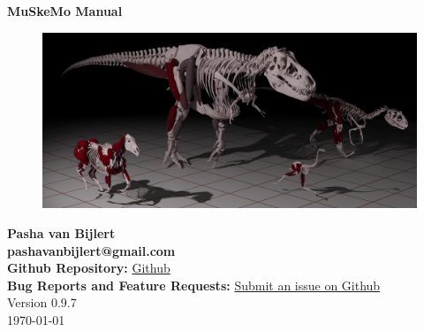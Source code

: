 \documentclass{article}
\begin{document}












\begin{center}
    {\huge \textbf{MuSkeMo Manual}}\\[20pt]  %
    \vspace{10pt}  %

    \begin{figure}[h]
        \centering
        \includegraphics[width=\textwidth]{figures/cover_pic.png} %
    \end{figure}
    \setcounter{figure}{0}
    \vspace{20pt} %
    
    {\Large \textbf{Pasha van Bijlert}}\\
    \vspace{10pt}
    \textbf{pashavanbijlert@gmail.com}\\
    \textbf{Github Repository:} \href{https://github.com/PashavanBijlert/MuSkeMo}{Github} \\
    \textbf{Bug Reports and Feature Requests:} \href{https://github.com/PashavanBijlert/MuSkeMo/issues}{Submit an issue on Github} \\
    \vspace{20pt}
    {\large Version 0.9.7} \\
    {\large \today}
\end{center}
\end{document}
